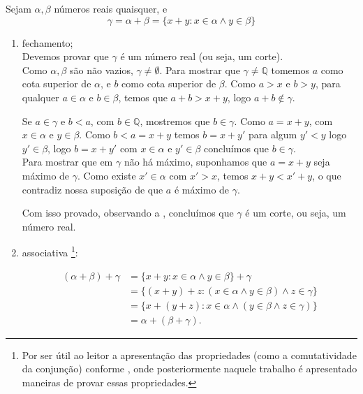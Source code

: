 \documentclass[../main.tex]{subfiles}
\begin{document}
\begin{dem}
    Sejam $\alpha, \beta$ números reais quaisquer, e \[ \gamma = \alpha + \beta = \{ x + y : x \in \alpha \land y \in \beta \} \]
    \begin{enumerate}[label=(\roman*)]
        \item fechamento; \\
            Devemos provar que $\gamma$ é um número real (ou seja, um corte). \\
            
            Como $\alpha, \beta$ são não vazios, $\gamma \neq \emptyset$. Para mostrar que $\gamma \neq \mathbb{Q}$ tomemos $a$ como cota superior de $\alpha$, e $b$ como cota superior de $\beta$. Como $a > x$ e $b > y$, para qualquer $a \in \alpha$ e $b \in \beta$, temos que $a + b > x + y$, logo $a+b \not\in \gamma$. 

            
            Se $a \in \gamma$ e $b < a$, com $b \in \mathbb{Q}$, mostremos que $b \in \gamma$. Como $a = x + y$, com $x \in \alpha$ e $y \in \beta$.
            Como $b < a = x + y$ temos $b = x + y'$ para algum $y' < y$ logo $y' \in \beta$, logo $b = x + y'$ com $x \in \alpha$ e $y' \in \beta$ concluímos que $b \in \gamma$. \\

            Para mostrar que em $\gamma$ não há máximo, suponhamos que $a = x + y$ seja máximo de $\gamma$. Como existe $x' \in \alpha$ com $x' > x$, temos $x + y < x' + y$, o que contradiz nossa suposição de que $a$ é máximo de $\gamma$.

            Com isso provado, observando a , concluímos que $\gamma$ é um corte, ou seja, um número real.
        
        \item associativa \footnote{Por ser útil ao leitor a apresentação das propriedades (como a comutatividade da conjunção) conforme \textcite[p. 147]{mortari}, onde posteriormente naquele trabalho é apresentado maneiras de provar essas propriedades.}: 

            \begin{align*}
                (\alpha+\beta)+\gamma &= \{ x+y: x \in \alpha \land y \in \beta \} + \gamma  \\
                &= \{ (x+y)+z : (x \in \alpha \land y \in \beta) \land z \in \gamma \} \\
                &= \{ x+(y+z) : x \in \alpha \land (y \in \beta \land z \in \gamma) \} \\
                &= \alpha + (\beta + \gamma).
            \end{align*}
            

\end{enumerate}
\end{dem}
\end{document}
